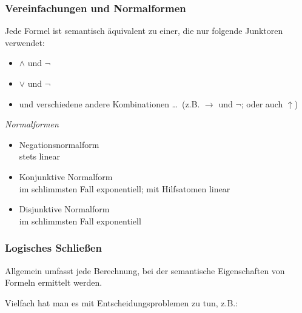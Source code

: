 \documentclass[aspectratio=1610,onlymath]{beamer}
\begin{document}
\begin{frame}\frametitle{Vereinfachungen und Normalformen}

Jede Formel ist semantisch äquivalent zu einer, die nur folgende Junktoren verwendet:
\begin{itemize}
\item $\wedge$ und $\neg$
\item $\vee$ und $\neg$
\item und verschiedene andere Kombinationen \ldots\ (z.B. $\to$ und $\neg$; oder auch $\uparrow$)
\end{itemize}\medskip

\emph{Normalformen}
\begin{itemize}
\item \alert{Negationsnormalform}\\
	stets linear
\item \alert{Konjunktive Normalform}\\
	im schlimmsten Fall exponentiell; mit Hilfsatomen linear
\item \alert{Disjunktive Normalform}\\
	im schlimmsten Fall exponentiell
\end{itemize}

\end{frame}


\begin{frame}\frametitle{Logisches Schließen}

Allgemein umfasst  jede Berechnung,
bei der semantische Eigenschaften von Formeln ermittelt werden.
\bigskip

Vielfach hat man es mit Entscheidungsproblemen zu tun, z.B.:




\end{frame}
\end{document}
